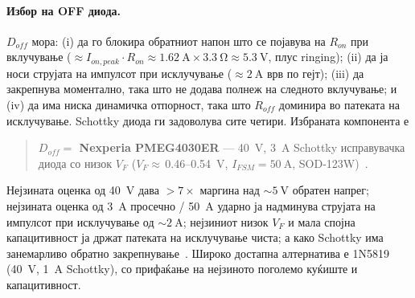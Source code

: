 \documentclass[journal,onecolumn,11pt]{IEEEtran}
\begin{document}
\paragraph{Избор на OFF диода.} $D_{off}$ мора: (i) да го блокира обратниот напон што
се појавува на $R_{on}$ при вклучување ($\approx I_{on,peak}\cdot R_{on}\approx
\SI{1.62}{\ampere}\times\SI{3.3}{\ohm}\approx\SI{5.3}{\volt}$, плус ringing); (ii) да
ја носи струјата на импулсот при исклучување ($\approx\SI{2}{\ampere}$ врв по гејт);
(iii) да закрепнува моментално, така што не додава полнеж на следното вклучување; и
(iv) да има ниска динамичка отпорност, така што $R_{off}$ доминира во патеката на
исклучување. Schottky диода ги задоволува сите четири. Избраната компонента е
\begin{quote}
\textbf{$D_{off}=$ Nexperia PMEG4030ER} --- \SI{40}{\volt}, \SI{3}{\ampere} Schottky
исправувачка диода со низок $V_{F}$ ($V_{F}\approx$\,0.46--\SI{0.54}{\volt},
$I_{FSM}=\SI{50}{\ampere}$, SOD-123W)~\cite{pmeg4030er}.
\end{quote}
Нејзината оценка од \SI{40}{\volt} дава $>7\times$ маргина над $\sim\SI{5}{\volt}$
обратен напрег; нејзината оценка од \SI{3}{\ampere} просечно / \SI{50}{\ampere}
ударно ја надминува струјата на импулсот при исклучување од $\sim\SI{2}{\ampere}$;
нејзиниот низок $V_F$ и мала спојна капацитивност ја држат патеката на исклучување
чиста; а како Schottky има занемарливо обратно закрепнување~\cite{pmeg4030er}. Широко
достапна алтернатива е 1N5819 (\SI{40}{\volt}, \SI{1}{\ampere} Schottky), со
прифаќање на нејзиното поголемо куќиште и капацитивност.
\end{document}
